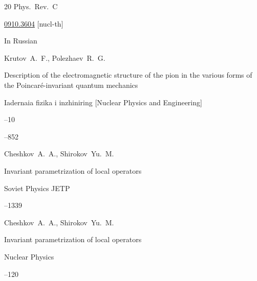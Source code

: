 \begin{thebibliography}{20}
\jour Phys.~Rev.~C







\arxiv \href{http://arxiv.org/abs/0910.3604}{0910.3604} [nucl-th]








\lang In Russian

\by  Krutov~A.~F., Polezhaev~R.~G.

\paper  Description of the electromagnetic structure of the pion in the various forms of the Poincar\'e-invariant quantum mechanics

\jour Iadernaia fizika i inzhiniring \rm [Nuclear Physics and Engineering]



--10

--852






\by Cheshkov~A.~A., Shirokov~Yu.~M.

\paper Invariant parametrization of local operators

\jour Soviet Physics JETP 



–1339

\moreref

\by Cheshkov~A.~A., Shirokov~Yu.~M.

\paper Invariant parametrization of local operators


\jour Nuclear Physics 


--120






\end{thebibliography}
